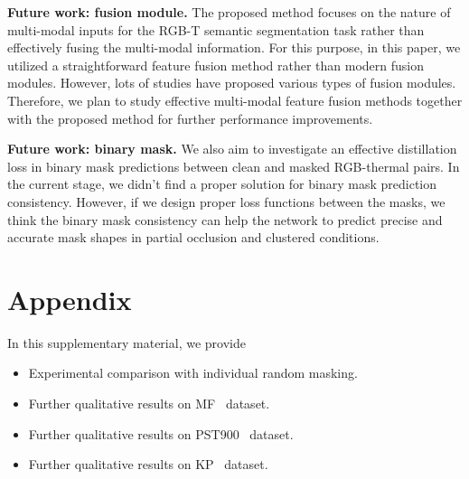 \documentclass[10pt,twocolumn,letterpaper]{article}
\begin{document}
\textbf{Future work: fusion module.} The proposed method focuses on the nature of multi-modal inputs for the RGB-T semantic segmentation task rather than effectively fusing the multi-modal information.
For this purpose, in this paper, we utilized a straightforward feature fusion method rather than modern fusion modules.
However, lots of studies have proposed various types of fusion modules. 
Therefore, we plan to study effective multi-modal feature fusion methods together with the proposed method for further performance improvements.

\textbf{Future work: binary mask.} We also aim to investigate an effective distillation loss in binary mask predictions between clean and masked RGB-thermal pairs.
In the current stage, we didn't find a proper solution for binary mask prediction consistency.
However, if we design proper loss functions between the masks, we think the binary mask consistency can help the network to predict precise and accurate mask shapes in partial occlusion and clustered conditions.









































 

{\small


}

\clearpage

\section{Appendix}
In this supplementary material, we provide

\begin{itemize}
\item 
Experimental comparison with individual random masking.
\item 
Further qualitative results on MF~\cite{ha2017mfnet} dataset.
\item 
Further qualitative results on PST900~\cite{shivakumar2019pst900} dataset.
\item 
Further qualitative results on KP~\cite{hwang2015multispectral} dataset.
\end{itemize}
\end{document}
